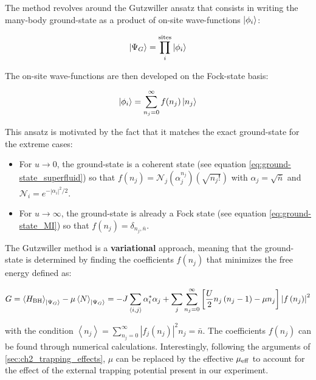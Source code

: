 The method revolves around the Gutzwiller ansatz that consists in writing the many-body ground-state as a product of on-site wave-functions $\ket{\phi_i}$:

\begin{equation}
    \ket{\Psi_G} = \prod_i^{\text{sites}} \ket{\phi_i}
\end{equation}

\noindent The on-site wave-functions are then developed on the Fock-state basis:

\begin{equation}
    \ket{\phi_i}= \sum_{n_j=0}^{\infty} f(n_j) \ket{n_j}
\end{equation}

This ansatz is motivated by the fact that it matches the exact ground-state for the extreme cases:

\begin{itemize}
    \item For $u \to 0$, the ground-state is a coherent state (see equation \ref{eq:ground-state_superfluid}) so that $f(n_j) = \mathcal{N}_{j}  (\alpha_{j}^{n_{j}})(\sqrt{n_{j} !})$ with $\alpha_j=\sqrt{\bar{n}}$ and $\mathcal{N}_{i}=e^{-\left|\alpha_{i}\right|^{2} / 2}$.
    \item For $u \to \infty$, the ground-state is already a Fock state (see equation \ref{eq:ground-state_MI}) so that $f(n_j) = \delta_{n_j,\bar{n}}$.
\end{itemize}

The Gutzwiller method is a \textbf{variational} approach, meaning that the ground-state is determined by finding the coefficients $f(n_j)$ that minimizes the free energy defined as:

\begin{equation}
    G = \left\langle H_{\mathrm{BH}}\right\rangle_{\ket{\Psi_G}} - \mu \left\langle N\right\rangle_{\ket{\Psi_G}} = -J \sum_{\langle i, j\rangle} \alpha_{i}^{*} \alpha_{j}+\sum_{j} \sum_{n_{j}=0}^{\infty}\left[\frac{U}{2} n_{j}\left(n_{j}-1\right)-\mu n_{j}\right]\left|f\left(n_{j}\right)\right|^{2}
\end{equation}

\noindent with the condition $\left\langle n_{j}\right\rangle=\sum_{n_{j}=0}^{\infty}\left|f_{j}\left(n_{j}\right)\right|^{2} n_{j}=\bar{n}$. The coefficients $f(n_j)$ can be found through numerical calculations. Interestingly, following the arguments of \ref{sec:ch2_trapping_effects}, $\mu$ can be replaced by the effective $\mu_{\rm{eff}}$ to account for the effect of the external trapping potential present in our experiment.


